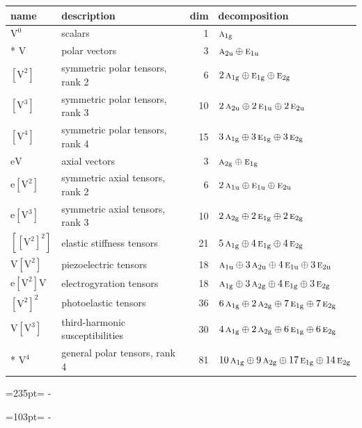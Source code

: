 \documentclass[10pt,a4paper]{article}
\newcommand{\needspace}[1]{\par\penalty-100\begingroup\dimen0=#1\relax\dimen2=\pagegoal
  \advance\dimen2-\pagetotal\ifdim\dimen0>\dimen2\relax\ifdim\dimen2>0pt\vfil\break\fi\fi
  \endgroup}
\numberwithin{equation}{section}
\newcommand{\irr}[1]{\text{\normalfont\scshape #1}}
\newcommand{\ptag}[1]{\mathrm{#1}}
\newcommand{\jahn}[1]{\mathrm{#1}}
\newlength{\fillwidth}\newlength{\cellwidth}\newlength{\colwidth}
\begin{document}
{\begin{longtable}{@{}llr>{\RaggedRight\arraybackslash}p{\fillwidth}@{}}
name & description & dim & decomposition\\\midrule\endhead
\bottomrule\endfoot\endlastfoot
$\jahn{V^{0}}$ & scalars & 1 & $\irr{a}_{1\ptag{g}}$\\*
$\jahn{V}$ & polar vectors & 3 & $\irr{a}_{2\ptag{u}} \oplus\allowbreak \irr{e}_{1\ptag{u}}$\\
$\jahn{[V^{2}]}$ & symmetric polar tensors, rank 2 & 6 & $2\,\irr{a}_{1\ptag{g}} \oplus\allowbreak \irr{e}_{1\ptag{g}} \oplus\allowbreak \irr{e}_{2\ptag{g}}$\\
$\jahn{[V^{3}]}$ & symmetric polar tensors, rank 3 & 10 & $2\,\irr{a}_{2\ptag{u}} \oplus\allowbreak 2\,\irr{e}_{1\ptag{u}} \oplus\allowbreak 2\,\irr{e}_{2\ptag{u}}$\\
$\jahn{[V^{4}]}$ & symmetric polar tensors, rank 4 & 15 & $3\,\irr{a}_{1\ptag{g}} \oplus\allowbreak 3\,\irr{e}_{1\ptag{g}} \oplus\allowbreak 3\,\irr{e}_{2\ptag{g}}$\\
$\jahn{eV}$ & axial vectors & 3 & $\irr{a}_{2\ptag{g}} \oplus\allowbreak \irr{e}_{1\ptag{g}}$\\
$\jahn{e[V^{2}]}$ & symmetric axial tensors, rank 2 & 6 & $2\,\irr{a}_{1\ptag{u}} \oplus\allowbreak \irr{e}_{1\ptag{u}} \oplus\allowbreak \irr{e}_{2\ptag{u}}$\\
$\jahn{e[V^{3}]}$ & symmetric axial tensors, rank 3 & 10 & $2\,\irr{a}_{2\ptag{g}} \oplus\allowbreak 2\,\irr{e}_{1\ptag{g}} \oplus\allowbreak 2\,\irr{e}_{2\ptag{g}}$\\
$\jahn{[[V^{2}]^{2}]}$ & elastic stiffness tensors & 21 & $5\,\irr{a}_{1\ptag{g}} \oplus\allowbreak 4\,\irr{e}_{1\ptag{g}} \oplus\allowbreak 4\,\irr{e}_{2\ptag{g}}$\\
$\jahn{V[V^{2}]}$ & piezoelectric tensors & 18 & $\irr{a}_{1\ptag{u}} \oplus\allowbreak 3\,\irr{a}_{2\ptag{u}} \oplus\allowbreak 4\,\irr{e}_{1\ptag{u}} \oplus\allowbreak 3\,\irr{e}_{2\ptag{u}}$\\
$\jahn{e[V^{2}]V}$ & electrogyration tensors & 18 & $\irr{a}_{1\ptag{g}} \oplus\allowbreak 3\,\irr{a}_{2\ptag{g}} \oplus\allowbreak 4\,\irr{e}_{1\ptag{g}} \oplus\allowbreak 3\,\irr{e}_{2\ptag{g}}$\\
$\jahn{[V^{2}]^{2}}$ & photoelastic tensors & 36 & $6\,\irr{a}_{1\ptag{g}} \oplus\allowbreak 2\,\irr{a}_{2\ptag{g}} \oplus\allowbreak 7\,\irr{e}_{1\ptag{g}} \oplus\allowbreak 7\,\irr{e}_{2\ptag{g}}$\\
$\jahn{V[V^{3}]}$ & third-harmonic susceptibilities & 30 & $4\,\irr{a}_{1\ptag{g}} \oplus\allowbreak 2\,\irr{a}_{2\ptag{g}} \oplus\allowbreak 6\,\irr{e}_{1\ptag{g}} \oplus\allowbreak 6\,\irr{e}_{2\ptag{g}}$\\*
$\jahn{V^{4}}$ & general polar tensors, rank 4 & 81 & $10\,\irr{a}_{1\ptag{g}} \oplus\allowbreak 9\,\irr{a}_{2\ptag{g}} \oplus\allowbreak 17\,\irr{e}_{1\ptag{g}} \oplus\allowbreak 14\,\irr{e}_{2\ptag{g}}$\\
\bottomrule\end{longtable}}
\needspace{235pt}
\needspace{103pt}
\end{document}
